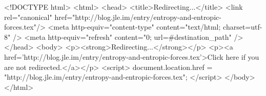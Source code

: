 <!DOCTYPE html>
<html>
<head>
<title>Redirecting...</title>
<link rel="canonical" href="http://blog.jle.im/entry/entropy-and-entropic-forces.tex"/>
<meta http-equiv="content-type" content="text/html; charset=utf-8" />
<meta http-equiv="refresh" content="0; url=#{destination_path}" />
</head>
<body>
  <p><strong>Redirecting...</strong></p>
  <p><a href='http://blog.jle.im/entry/entropy-and-entropic-forces.tex'>Click here if you are not redirected.</a></p>
  <script>
    document.location.href = "http://blog.jle.im/entry/entropy-and-entropic-forces.tex";
  </script>
</body>
</html>
